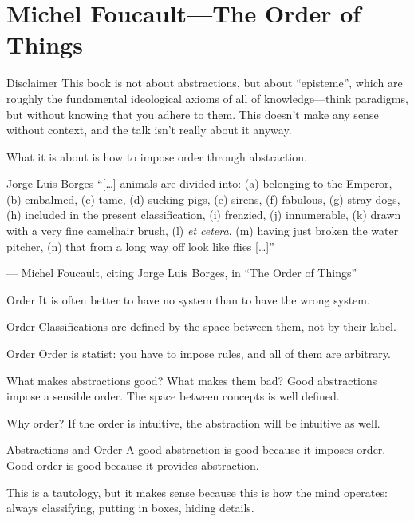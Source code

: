 \documentclass[aspectratio=169]{beamer}
\begin{document}
  \section{Michel Foucault—The Order of Things}
  \begin{frame}{Disclaimer}
    This book is not about abstractions, but about “episteme”, which are roughly
    the fundamental ideological axioms of all of knowledge—think paradigms, but
    without knowing that you adhere to them. This doesn’t make any sense
    without context, and the talk isn’t really about it anyway.

    What it is about is how to impose order through abstraction.
  \end{frame}
  \begin{frame}{Jorge Luis Borges}
    “[\ldots] animals are divided into: (a) belonging to the Emperor, (b)
    embalmed, (c) tame, (d) sucking pigs, (e) sirens, (f) fabulous, (g) stray
    dogs, (h) included in the present classification, (i) frenzied, (j)
    innumerable, (k) drawn with a very fine camelhair brush, (l) \textit{et
    cetera}, (m) having just broken the water pitcher, (n) that from a long
    way off look like flies [\ldots]”

    — Michel Foucault, citing Jorge Luis Borges, in “The Order of Things”
  \end{frame}
  \begin{frame}{Order}
    It is often better to have no system than to have the wrong system.
  \end{frame}
  \begin{frame}{Order}
    Classifications are defined by the space between them, not by their label.
  \end{frame}
  \begin{frame}{Order}
    Order is statist: you have to impose rules, and all of them are arbitrary.
  \end{frame}
  \begin{frame}{What makes abstractions good? What makes them bad?}
    Good abstractions impose a sensible order. The space between concepts is
    well defined.
  \end{frame}
  \begin{frame}{Why order?}
    If the order is intuitive, the abstraction will be intuitive as well.
  \end{frame}
  \begin{frame}{Abstractions and Order}
    A good abstraction is good because it imposes order. Good order is good
    because it provides abstraction.

    This is a tautology, but it makes sense because this is how the mind
    operates: always classifying, putting in boxes, hiding details.
  \end{frame}
\end{document}
